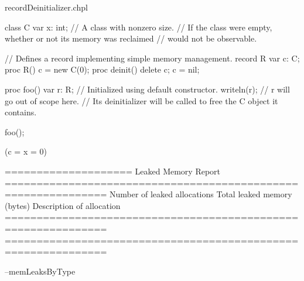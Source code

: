 


\begin{chapelexample}{recordDeinitializer.chpl}
\begin{chapel}
class C { var x: int; } // A class with nonzero size.
// If the class were empty, whether or not its memory was reclaimed
// would not be observable.

// Defines a record implementing simple memory management.
record R {
  var c: C;
  proc R() { c = new C(0); }
  proc deinit() { delete c; c = nil; }
}

proc foo()
{
  var r: R; // Initialized using default constructor.
  writeln(r);
  // r will go out of scope here.
  // Its deinitializer will be called to free the C object it contains.
}

foo();
\end{chapel}
\begin{chapeloutput}
(c = {x = 0})

====================
Leaked Memory Report
==============================================================
Number of leaked allocations
           Total leaked memory (bytes)
                      Description of allocation
==============================================================
==============================================================
\end{chapeloutput}
\begin{chapelexecopts}
--memLeaksByType
\end{chapelexecopts}
\end{chapelexample}


